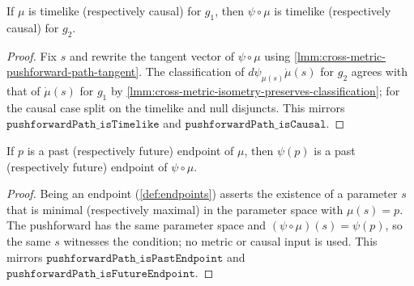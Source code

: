 \begin{lemma}
    \label{lmm:cross-metric-pushforward-path-causal}
    \leanok
    If $\mu$ is timelike (respectively causal) for $g_1$, then $\psi \circ \mu$ is timelike (respectively causal) for $g_2$.
\end{lemma}
\begin{proof}
    \leanok
    Fix $s$ and rewrite the tangent vector of $\psi \circ \mu$ using \ref{lmm:cross-metric-pushforward-path-tangent}. The classification of $d\psi_{\mu(s)}\dot\mu(s)$ for $g_2$ agrees with that of $\dot\mu(s)$ for $g_1$ by \ref{lmm:cross-metric-isometry-preserves-classification}; for the causal case split on the timelike and null disjuncts. This mirrors $\mathtt{pushforwardPath\_isTimelike}$ and $\mathtt{pushforwardPath\_isCausal}$.
\end{proof}

\begin{lemma}
    \label{lmm:cross-metric-pushforward-path-endpoints}
    \leanok
    If $p$ is a past (respectively future) endpoint of $\mu$, then $\psi(p)$ is a past (respectively future) endpoint of $\psi \circ \mu$.
\end{lemma}
\begin{proof}
    \leanok
    Being an endpoint (\ref{def:endpoints}) asserts the existence of a parameter $s$ that is minimal (respectively maximal) in the parameter space with $\mu(s) = p$. The pushforward has the same parameter space and $(\psi \circ \mu)(s) = \psi(p)$, so the same $s$ witnesses the condition; no metric or causal input is used. This mirrors $\mathtt{pushforwardPath\_isPastEndpoint}$ and $\mathtt{pushforwardPath\_isFutureEndpoint}$.
\end{proof}

